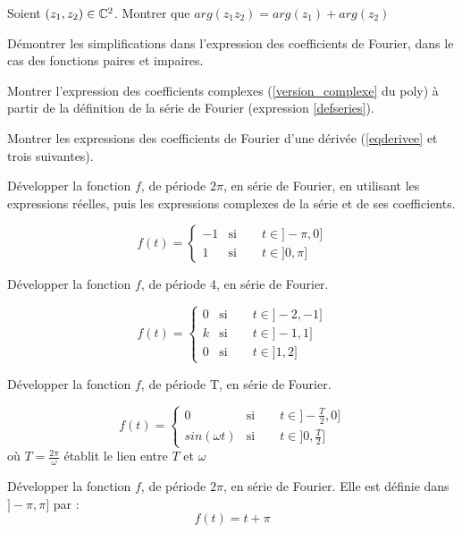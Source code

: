 


\exercice
Soient $(z_1,z_2)\in \mathbb{C}^2$. Montrer que $arg(z_1z_2)=arg(z_1)+arg(z_2)$

\exercice 
Démontrer les simplifications dans l'expression des coefficients de Fourier, dans le cas des fonctions paires et impaires.

\exercice 
Montrer l'expression des coefficients complexes (\ref{version_complexe} du poly) à partir de la définition de la série de Fourier (expression \ref{defseries}). 

\exercice
Montrer les expressions des coefficients de Fourier d'une dérivée (\ref{eqderivee} et trois suivantes).

\exercice
Développer la fonction $f$, de période $2\pi$, en série de Fourier, en utilisant les expressions réelles, puis les expressions complexes de la série et de ses coefficients.

\begin{equation*}
f(t)=
\begin{cases}
-1 & \text{si}\qquad t\in ]-\pi,0] \\
1 & \text{si}\qquad t\in ]0,\pi]
\end{cases}
\end{equation*} 

\exercice
Développer la fonction $f$, de période 4, en série de Fourier.

\begin{equation*}
f(t)=
\begin{cases}
 0 & \text{si}\qquad t\in ]-2,-1] \\
 k & \text{si}\qquad t\in ]-1,1] \\
 0 & \text{si}\qquad t\in ]1,2] 
\end{cases}
\end{equation*} 


\exercice
Développer la fonction $f$, de période T, en série de Fourier.

\begin{equation*}
f(t)=
\begin{cases}
 0 & \text{si}\qquad t\in ]-\frac{T}{2},0] \\
 sin(\omega t) & \text{si}\qquad t\in ]0,\frac{T}{2}]
\end{cases}
\end{equation*} 
où $T=\frac{2\pi}{\omega}$ établit le lien entre $T$ et $\omega$

\exercice
Développer la fonction $f$, de période $2\pi$, en série de Fourier. Elle est définie dans $]-\pi,\pi]$ par :
\begin{equation*}
f(t)= t+\pi
\end{equation*} 

